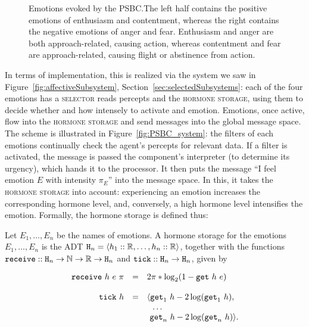 \begin{figure}[!h]
	\centering
	
	\caption{Emotions evoked by the \textsc{PSBC}.The left half contains the positive emotions of enthusiasm and contentment, whereas the right contains the negative emotions of anger and fear. Enthusiasm and anger are both approach-related, causing action, whereas contentment and fear are approach-related, causing flight or abstinence from action.}
	\label{fig:PSBC}
\end{figure}

In terms of implementation, this is realized via the system we saw in Figure~\ref{fig:affectiveSubsystem}, Section~\ref{sec:selectedSubsystems}: each of the four emotions has a \textsc{selector} reads percepts and the \textsc{hormone storage}, using them to decide whether and how intensely to activate and emotion. Emotions, once active, flow into the \textsc{hormone storage} and send messages into the global message space. The scheme is illustrated in Figure~\ref{fig:PSBC_system}: the filters of each emotions continually check the agent's percepts for relevant data. If a filter is activated, the message is passed the component's interpreter (to determine its urgency), which hands it to the processor. It then puts the message ``I feel emotion $E$ with intensity $\pi_E$'' into the message space. In this, it takes the \textsc{hormone storage} into account: experiencing an emotion increases the corresponding hormone level, and, conversely, a high hormone level intensifies the emotion. Formally, the hormone storage is defined thus:

\begin{definition}
	Let $E_1,\dots,E_n$ be the names of emotions. A hormone storage for the emotions $E_1,\dots,E_n$ is the ADT $\mathtt{H}_n = \langle h_1 :: \mathbb{R}, \dots, h_n :: \mathbb{R} \rangle$, together with the functions $\mathtt{receive} :: \mathtt{H}_n \rightarrow \mathbb{N} \rightarrow \mathbb{R} \rightarrow \mathtt{H}_n$ and $\mathtt{tick} :: \mathtt{H}_n \rightarrow \mathtt{H}_n$, given by
	
	$$
		\begin{array}{r c l}
			\mathtt{receive}\ h\ e\ \pi & = & 2\pi * \log_2(1-\mathtt{get}\ h\ e)\\
			\\
			\mathtt{tick}\ h & = & \langle \mathtt{get}_1\ h - 2\log(\mathtt{get}_1\ h),\\
							 &   & \ \ \dots\\
							 &   & \ \mathtt{get}_n\ h - 2\log(\mathtt{get}_n\ h) \rangle.
		\end{array}
	$$
\end{definition}

